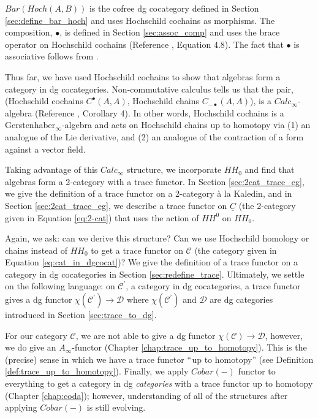 $Bar(Hoch(A,B))$ is the cofree dg cocategory defined in Section \ref{sec:define_bar_hoch} and uses Hochschild cochains as morphisms. The composition, $\bullet$, is defined in Section \ref{sec:assoc_comp} and uses the brace operator on Hochschild cochains (Reference \cite{T}, Equation 4.8). The fact that $\bullet$ is associative follows from \cite{(Getzler-Jones; Voronov-Gerstenhaber, Lyubashenko-Manzyuk; Keller)}. 

Thus far, we have used Hochschild cochains to show that algebras form a category in dg cocategories. Non-commutative calculus tells us that the pair, (Hochschild cochains $C^\bullet(A,A)$, Hochschild chains $C_{-\bullet}(A,A)$), is a $Calc_\infty$-algebra (Reference \cite{DTT}, Corollary 4). In other words, Hochschild cochains is a Gerstenhaber$_\infty$-algebra and acts on Hochschild chains up to homotopy via (1) an analogue of the Lie derivative, and (2) an analogue of the contraction of a form against a vector field.

Taking advantage of this $Calc_\infty$ structure, we incorporate $HH_0$ and find that algebras form a 2-category with a trace functor. In Section \ref{sec:2cat_trace_eg}, we give the definition of a trace functor on a 2-category \`{a} la Kaledin, and in Section \ref{sec:2cat_trace_eg}, we describe a trace functor on $\underline{C}$ (the 2-category given in Equation \ref{eq:2-cat}) that uses the action of $HH^0$ on $HH_0$.

Again, we ask: can we derive this structure? Can we use Hochschild homology or chains instead of $HH_0$ to get a trace functor on $\mathcal{C}$ (the category given in Equation \ref{eq:cat_in_dgcocat})? We give the definition of a trace functor on a category in dg cocategories in Section \ref{sec:redefine_trace}. Ultimately, we settle on the following language: on $\mathcal{C}^\prime$, a category in dg cocategories, a trace functor gives a dg functor $\chi(\mathcal{C}^\prime) \to \mathcal{D}$ where $\chi(\mathcal{C}^\prime)$ and $\mathcal{D}$ are dg categories introduced in Section \ref{sec:trace_to_dg}. 

For our category $\mathcal{C}$, we are not able to give a dg functor $\chi(\mathcal{C}) \to \mathcal{D}$, however, we do give an $A_\infty$-functor (Chapter \ref{chap:trace_up_to_homotopy}). This is the (precise) sense in which we have a trace functor $``$up to homotopy'' (see Definition \ref{def:trace_up_to_homotopy}). Finally, we apply $Cobar(-)$ functor to everything to get a category in dg \textit{categories} with a trace functor up to homotopy (Chapter \ref{chap:coda}); however, understanding of all of the structures after applying $Cobar(-)$ is still evolving.


